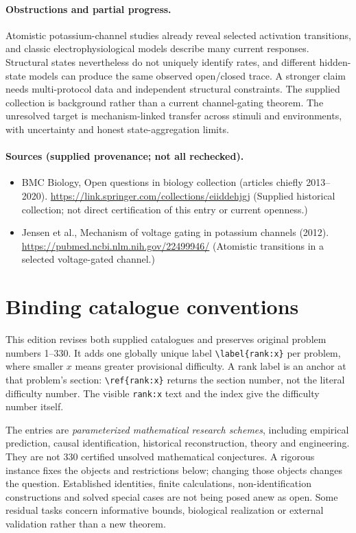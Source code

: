 \documentclass[11pt]{article}
\begin{document}
\paragraph{Obstructions and partial progress.} Atomistic potassium-channel studies already reveal selected activation transitions, and classic electrophysiological models describe many current responses. Structural states nevertheless do not uniquely identify rates, and different hidden-state models can produce the same observed open/closed trace. A stronger claim needs multi-protocol data and independent structural constraints. The supplied collection is background rather than a current channel-gating theorem. The unresolved target is mechanism-linked transfer across stimuli and environments, with uncertainty and honest state-aggregation limits.
\paragraph{Sources (supplied provenance; not all rechecked).}
\begin{itemize}
\item BMC Biology, Open questions in biology collection (articles chiefly 2013--2020). \url{https://link.springer.com/collections/eiiddehjgj} (Supplied historical collection; not direct certification of this entry or current openness.)
\item Jensen et al., Mechanism of voltage gating in potassium channels (2012). \url{https://pubmed.ncbi.nlm.nih.gov/22499946/} (Atomistic transitions in a selected voltage-gated channel.)
\end{itemize}


\section*{Binding catalogue conventions}
This edition revises both supplied catalogues and preserves original problem numbers 1--330. It adds one globally unique label \verb|\label{rank:x}| per problem, where smaller $x$ means greater provisional difficulty. A rank label is an anchor at that problem's section: \verb|\ref{rank:x}| returns the section number, not the literal difficulty number. The visible \texttt{rank:x} text and the index give the difficulty number itself.

The entries are \emph{parameterized mathematical research schemes}, including empirical prediction, causal identification, historical reconstruction, theory and engineering. They are not 330 certified unsolved mathematical conjectures. A rigorous instance fixes the objects and restrictions below; changing those objects changes the question. Established identities, finite calculations, non-identification constructions and solved special cases are not being posed anew as open. Some residual tasks concern informative bounds, biological realization or external validation rather than a new theorem.
\end{document}
